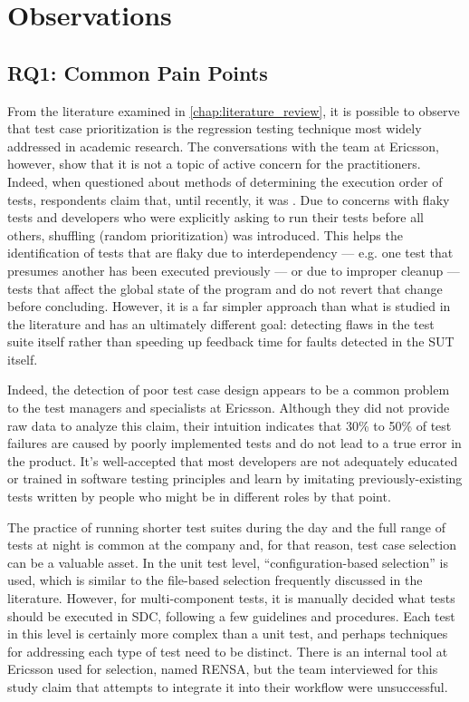 \section{Observations}
\label{sec:ind_observations}

\subsection{RQ1: Common Pain Points}
\label{sec:ind_rq1}

From the literature examined in \autoref{chap:literature_review}, it is possible to observe that test case prioritization is the regression testing technique most widely addressed in academic research.
The conversations with the team at Ericsson, however, show that it is not a topic of active concern for the practitioners.
Indeed, when questioned about methods of determining the execution order of tests, respondents claim that, until recently, it was .
Due to concerns with flaky tests and developers who were explicitly asking to run their tests before all others, shuffling (random prioritization) was introduced.
This helps the identification of tests that are flaky due to interdependency — e.g. one test that presumes another has been executed previously — or due to improper cleanup — tests that affect the global state of the program and do not revert that change before concluding.
However, it is a far simpler approach than what is studied in the literature and has an ultimately different goal: detecting flaws in the test suite itself rather than speeding up feedback time for faults detected in the SUT itself.

Indeed, the detection of poor test case design appears to be a common problem to the test managers and specialists at Ericsson.
Although they did not provide raw data to analyze this claim, their intuition indicates that 30\% to 50\% of test failures are caused by poorly implemented tests and do not lead to a true error in the product.
It's well-accepted that most developers are not adequately educated or trained in software testing principles and learn by imitating previously-existing tests written by people who might be in different roles by that point.

The practice of running shorter test suites during the day and the full range of tests at night is common at the company and, for that reason, test case selection can be a valuable asset.
In the unit test level, ``configuration-based selection'' is used, which is similar to the file-based selection frequently discussed in the literature.
However, for multi-component tests, it is manually decided what tests should be executed in SDC, following a few guidelines and procedures.
Each test in this level is certainly more complex than a unit test, and perhaps techniques for addressing each type of test need to be distinct.
There is an internal tool at Ericsson used for selection, named RENSA, but the team interviewed for this study claim that attempts to integrate it into their workflow were unsuccessful.

